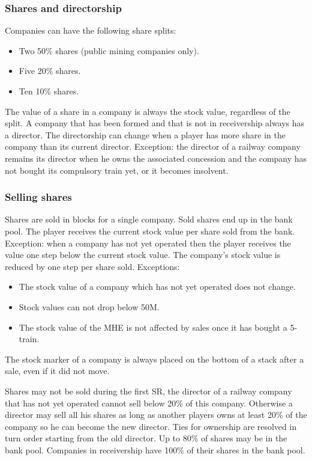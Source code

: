 \documentclass[a4paper,twocolumn]{article}
\begin{document}
\subsubsection{Shares and directorship}
Companies can have the following share splits:
\begin{itemize}
	\item Two 50\% shares (public mining companies only).
	\item Five 20\% shares.
	\item Ten 10\% shares.
\end{itemize}

The value of a share in a company is always the stock value, regardless of the
split. A company that has been formed and that is not in receivership always has
a director. The directorship can change when a player has more share in the
company than its current director. Exception: the director of a railway company
remains its director when he owns the associated concession and the company has
not bought its compulsory train yet, or it becomes insolvent.

\subsubsection{Selling shares}
Shares are sold in blocks for a single company. Sold shares end up in the bank
pool. The player receives the current stock value per share sold from the bank.
Exception: when a company has not yet operated then the player receives the
value one step below the current stock value. The company's stock value is
reduced by one step per share sold. Exceptions:
\begin{itemize}
	\item The stock value of a company which has not yet operated does not
	change.
	\item Stock values can not drop below 50M.
	\item The stock value of the MHE is not affected by sales once it has
	bought a 5-train.
\end{itemize}

The stock marker of a company is always placed on the bottom of a stack after a
sale, even if it did not move.

Shares may not be sold during the first SR, the director of a railway company
that has not yet operated cannot sell below 20\% of this company. Otherwise a
director may sell all his shares as long as another players owns at least 20\%
of the company so he can become the new director. Ties for ownership are
resolved in turn order starting from the old director. Up to 80\% of shares may
be in the bank pool. Companies in receivership have 100\% of their shares in the
bank pool.
\end{document}
